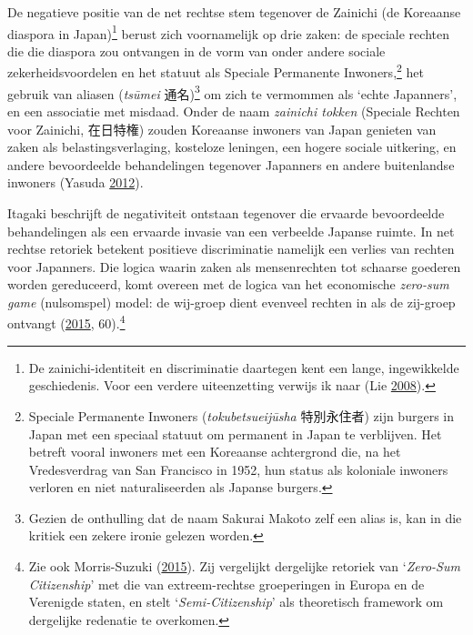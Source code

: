 \documentclass[10.5pt,dutch,]{article}
\begin{document}
De negatieve positie van de net rechtse stem tegenover de Zainichi (de
Koreaanse diaspora in Japan)\footnote{De zainichi-identiteit en
  discriminatie daartegen kent een lange, ingewikkelde geschiedenis.
  Voor een verdere uiteenzetting verwijs ik naar (Lie
  \protect\hyperlink{ref-lieux5fzainichiux5f2008}{2008}).} berust zich
voornamelijk op drie zaken: de speciale rechten die die diaspora zou
ontvangen in de vorm van onder andere sociale zekerheidsvoordelen en het
statuut als Speciale Permanente Inwoners,\footnote{Speciale Permanente
  Inwoners (\emph{tokubetsueijūsha} 特別永住者) zijn burgers in Japan
  met een speciaal statuut om permanent in Japan te verblijven. Het
  betreft vooral inwoners met een Koreaanse achtergrond die, na het
  Vredesverdrag van San Francisco in 1952, hun status als koloniale
  inwoners verloren en niet naturaliseerden als Japanse burgers.} het
gebruik van aliasen (\emph{tsūmei} 通名)\footnote{Gezien de onthulling
  dat de naam Sakurai Makoto zelf een alias is, kan in die kritiek een
  zekere ironie gelezen worden.} om zich te vermommen als `echte
Japanners', en een associatie met misdaad. Onder de naam \emph{zainichi
tokken} (Speciale Rechten voor Zainichi, 在日特権) zouden Koreaanse
inwoners van Japan genieten van zaken als belastingsverlaging, kosteloze
leningen, een hogere sociale uitkering, en andere bevoordeelde
behandelingen tegenover Japanners en andere buitenlandse inwoners
(Yasuda \protect\hyperlink{ref-yasudaux5fnettoux5f2012}{2012}).

Itagaki beschrijft de negativiteit ontstaan tegenover die ervaarde
bevoordeelde behandelingen als een ervaarde invasie van een verbeelde
Japanse ruimte. In net rechtse retoriek betekent positieve discriminatie
namelijk een verlies van rechten voor Japanners. Die logica waarin zaken
als mensenrechten tot schaarse goederen worden gereduceerd, komt overeen
met de logica van het economische \emph{zero-sum game} (nulsomspel)
model: de wij-groep dient evenveel rechten in als de zij-groep ontvangt
(\protect\hyperlink{ref-itagakiux5fanatomyux5f2015}{2015},
60).\footnote{Zie ook Morris-Suzuki
  (\protect\hyperlink{ref-morris-suzukiux5fbeyondux5f2015}{2015}). Zij
  vergelijkt dergelijke retoriek van `\emph{Zero-Sum Citizenship}' met
  die van extreem-rechtse groeperingen in Europa en de Verenigde staten,
  en stelt `\emph{Semi-Citizenship}' als theoretisch framework om
  dergelijke redenatie te overkomen.}
\end{document}
